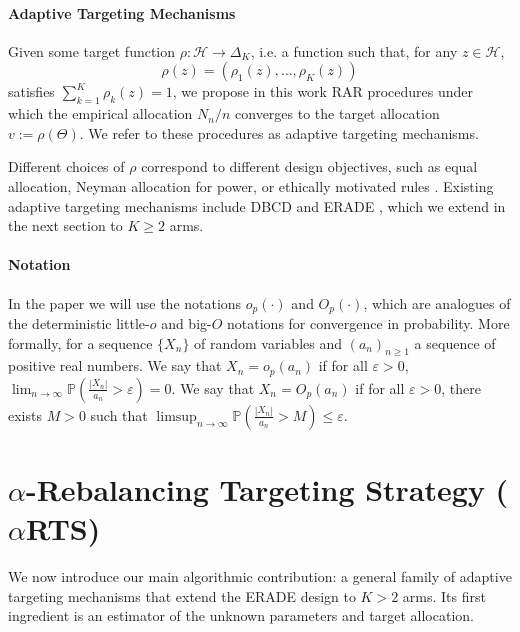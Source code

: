 \documentclass[11pt]{article}
\theoremstyle{plain}
\theoremstyle{definition}
\begin{document}
\paragraph*{Adaptive Targeting Mechanisms} Given some target function $\rho : \mathcal{H} \rightarrow \Delta_K$, i.e. a function such that, for any $z \in \mathcal{H}$,
\[
\rho(z) = (\rho_1(z), \ldots, \rho_K(z))
\]
satisfies $\sum_{k=1}^{K}\rho_{k}(z)=1$, we propose in this work RAR procedures under which the empirical allocation $N_n/n$ converges to the target allocation $v := \rho(\Theta)$. We refer to these procedures as adaptive targeting mechanisms.

Different choices of $\rho$ correspond to different design objectives, such as equal allocation, Neyman allocation for power, or ethically motivated rules \citep{pin2024response}.
Existing adaptive targeting mechanisms include DBCD \citep{hu2004asymptotic} and ERADE \citep{hu2006theory}, which we extend in the next section to $K \geq 2$ arms.


\paragraph*{Notation}
In the paper we will use the notations $o_p(\cdot)$ and $O_p(\cdot)$, which are analogues of the deterministic little-$o$ and big-$O$ notations for convergence in probability.
More formally, for a sequence $\{X_n\}$ of random variables and $\left(a_n\right)_{n \geq 1}$ a sequence of positive real numbers.
We say that $X_n = o_p(a_n)$ if for all $\varepsilon > 0$, \(\lim_{n \to \infty} \mathbb{P}\!\left( \frac{|X_n|}{a_n} > \varepsilon \right) = 0.\)
We say that $X_n = O_p(a_n)$ if for all $\varepsilon > 0$, there exists $M > 0$ such that \(\limsup_{n \to \infty} \mathbb{P}\!\left( \frac{|X_n|}{a_n} > M \right) \leq \varepsilon.\)		
	

	
	\section{$\alpha$-Rebalancing Targeting Strategy (\(\alpha\)RTS)}\label{sec:alpha-rts}
We now introduce our main algorithmic contribution: a general family of adaptive targeting mechanisms that extend the ERADE design to $K> 2$ arms. Its first ingredient is an estimator of the unknown parameters and target allocation.
\end{document}
